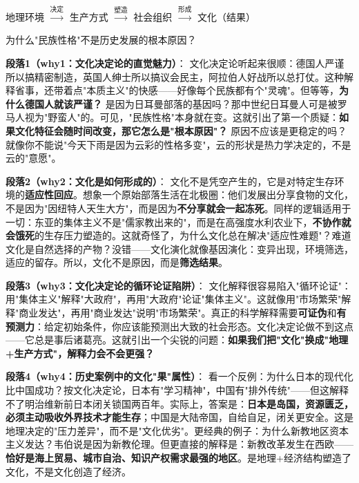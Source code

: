 \documentclass[../main.tex]{subfiles}
\begin{document}
	\begin{logicmap}
		地理环境 $\xrightarrow{\text{决定}}$ 生产方式 $\xrightarrow{\text{塑造}}$ 社会组织 $\xrightarrow{\text{形成}}$ 文化（结果）
	\end{logicmap}
	
	\begin{questionbox}
		为什么"民族性格"不是历史发展的根本原因？
	\end{questionbox}
	
	\textbf{段落1（why1：文化决定论的直觉魅力）}：  
	文化决定论听起来很顺：德国人严谨所以搞精密制造，英国人绅士所以搞议会民主，阿拉伯人好战所以总打仗。这种解释省事，还带着点"本质主义"的快感——好像每个民族都有个"灵魂"。但等等，\textbf{为什么德国人就该严谨？} 是因为日耳曼部落的基因吗？那中世纪日耳曼人可是被罗马人视为"野蛮人"的。可见，"民族性格"本身就在变。这就引出了第一个质疑：\textbf{如果文化特征会随时间改变，那它怎么是"根本原因"？} 原因不应该是更稳定的吗？就像你不能说"今天下雨是因为云彩的性格多变"，云的形状是热力学决定的，不是云的"意愿"。
	
	\textbf{段落2（why2：文化是如何形成的）}：  
	文化不是凭空产生的，它是对特定生存环境的\textbf{适应性回应}。想象一个原始部落生活在北极圈：他们发展出分享食物的文化，不是因为"因纽特人天生大方"，而是因为\textbf{不分享就会一起冻死}。同样的逻辑适用于一切：东亚的集体主义不是"儒家教出来的"，而是在高强度水利农业下，\textbf{不协作就会饿死}的生存压力塑造的。这就奇怪了，为什么文化总在解决"适应性难题"？难道文化是自然选择的产物？没错——文化演化就像基因演化：变异出现，环境筛选，适应的留存。所以，文化不是原因，而是\textbf{筛选结果}。
	
	\textbf{段落3（why3：文化决定论的循环论证陷阱）}：  
	文化解释很容易陷入"循环论证"：用"集体主义"解释"大政府"，再用"大政府"论证"集体主义"。这就像用"市场繁荣"解释"商业发达"，再用"商业发达"说明"市场繁荣"。真正的科学解释需要\textbf{可证伪}和\textbf{有预测力}：给定初始条件，你应该能预测出大致的社会形态。文化决定论做不到这点——它总是事后诸葛亮。这就引出一个尖锐的问题：\textbf{如果我们把"文化"换成"地理+生产方式"，解释力会不会更强？}
	
	\textbf{段落4（why4：历史案例中的文化"果"属性）}：  
	看一个反例：为什么日本的现代化比中国成功？按文化决定论，日本有"学习精神"，中国有"排外传统"——但这解释不了明治维新前日本闭关锁国两百年。实际上，答案是：\textbf{日本是岛国，资源匮乏，必须主动吸收外界技术才能生存}；中国是大陆帝国，自给自足，闭关更安全。这是地理决定的"压力差异"，而不是"文化优劣"。更经典的例子：为什么新教地区资本主义发达？韦伯说是因为新教伦理。但更直接的解释是：新教改革发生在西欧——\textbf{恰好是海上贸易、城市自治、知识产权需求最强的地区}。是地理+经济结构塑造了文化，不是文化创造了经济。
	
\end{document}
